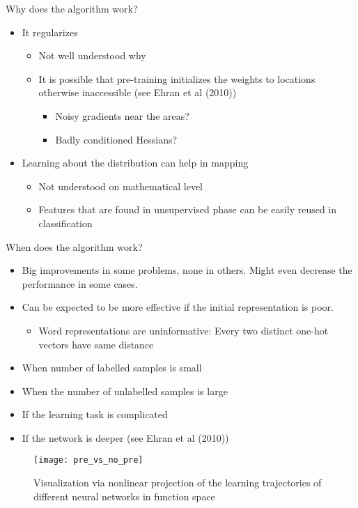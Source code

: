 \begin{frame}
Why does the algorithm work?
\begin{itemize}
\item It regularizes
\begin{itemize}
\item Not well understood why
\item It is possible that pre-training initializes the weights to locations otherwise inaccessible (see Ehran et al (2010))
\begin{itemize}
\item Noisy gradients near the areas?
\item Badly conditioned Hessians?
\end{itemize}
\end{itemize}
\item Learning about the distribution can help in mapping 
\begin{itemize}
\item Not understood on mathematical level
\item Features that are found in unsupervised phase can be easily reused in classification
\end{itemize}
\end{itemize}
\end{frame}

\begin{frame}
When does the algorithm work?
\begin{itemize}
\item Big improvements in some problems, none in others. Might even decrease the performance in some cases.
\item Can be expected to be more effective if the initial representation is poor.
\begin{itemize}
\item Word representations are uninformative: Every two distinct one-hot vectors have same distance 
\end{itemize}
\item When number of labelled samples is small
\item When the number of unlabelled samples is large
\item If the learning task is complicated
\item If the network is deeper (see Ehran et al (2010))
\end{itemize}
\end{frame}


\begin{frame}
\begin{figure}[t]
\centering
\texttt{[image: pre\_vs\_no\_pre]} %
\caption{Visualization via nonlinear projection of the learning trajectories of different
neural networks in function space}
\end{figure}
\end{frame}


